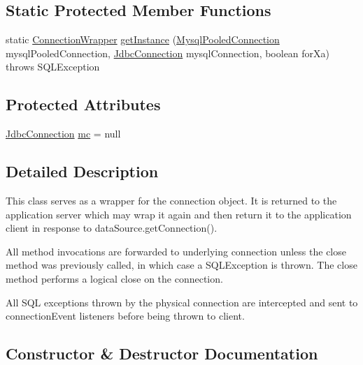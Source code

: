\subsection*{Static Protected Member Functions}
\begin{DoxyCompactItemize}
\item 
static \mbox{\hyperlink{classcom_1_1mysql_1_1cj_1_1jdbc_1_1_connection_wrapper}{Connection\+Wrapper}} \mbox{\hyperlink{classcom_1_1mysql_1_1cj_1_1jdbc_1_1_connection_wrapper_ad9866059f50d1008a2ffb298467736c0}{get\+Instance}} (\mbox{\hyperlink{classcom_1_1mysql_1_1cj_1_1jdbc_1_1_mysql_pooled_connection}{Mysql\+Pooled\+Connection}} mysql\+Pooled\+Connection, \mbox{\hyperlink{interfacecom_1_1mysql_1_1cj_1_1jdbc_1_1_jdbc_connection}{Jdbc\+Connection}} mysql\+Connection, boolean for\+Xa)  throws S\+Q\+L\+Exception 
\end{DoxyCompactItemize}
\subsection*{Protected Attributes}
\begin{DoxyCompactItemize}
\item 
\mbox{\hyperlink{interfacecom_1_1mysql_1_1cj_1_1jdbc_1_1_jdbc_connection}{Jdbc\+Connection}} \mbox{\hyperlink{classcom_1_1mysql_1_1cj_1_1jdbc_1_1_connection_wrapper_a6d5e7cd28deac2089c54a5c79e6d5efc}{mc}} = null
\end{DoxyCompactItemize}


\subsection{Detailed Description}
This class serves as a wrapper for the connection object. It is returned to the application server which may wrap it again and then return it to the application client in response to data\+Source.\+get\+Connection().

All method invocations are forwarded to underlying connection unless the close method was previously called, in which case a S\+Q\+L\+Exception is thrown. The close method performs a \textquotesingle{}logical close\textquotesingle{} on the connection.

All S\+QL exceptions thrown by the physical connection are intercepted and sent to connection\+Event listeners before being thrown to client. 

\subsection{Constructor \& Destructor Documentation}
\mbox{\label{classcom_1_1mysql_1_1cj_1_1jdbc_1_1_connection_wrapper_a6dbecfe42d98fb8c3f0ff7081ccc07cf}} 
